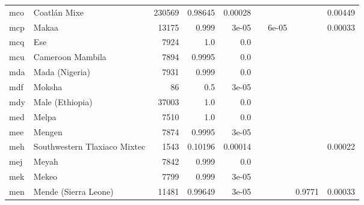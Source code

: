 \documentclass[11pt]{article}
\begin{document}
\begin{table*}[h]
{\begin{tabular}{llrrrrrrr}
mco         & Coatlán Mixe         & 230569         & 0.98645         & 0.00028         &          &          &          & 0.00449         \\

mcp         & Makaa         & 13175         & 0.999         & 3e-05         &          & 6e-05         &          & 0.00033         \\

mcq         & Ese         & 7924         & 1.0         & 0.0         &          &          &          &          \\

mcu         & Cameroon Mambila         & 7894         & 0.9995         & 0.0         &          &          &          &          \\

mda         & Mada (Nigeria)         & 7931         & 0.999         & 0.0         &          &          &          &          \\

mdf         & Moksha         & 86         & 0.5         & 3e-05         &          &          &          &          \\

mdy         & Male (Ethiopia)         & 37003         & 1.0         & 0.0         &          &          &          &          \\

med         & Melpa         & 7510         & 1.0         & 0.0         &          &          &          &          \\

mee         & Mengen         & 7874         & 0.9995         & 3e-05         &          &          &          &          \\

meh         & Southwestern Tlaxiaco Mixtec         & 1543         & 0.10196         & 0.00014         &          &          &          & 0.00022         \\

mej         & Meyah         & 7842         & 0.999         & 0.0         &          &          &          &          \\

mek         & Mekeo         & 7799         & 0.999         & 3e-05         &          &          &          &          \\

men         & Mende (Sierra Leone)         & 11481         & 0.99649         & 3e-05         &          &          & 0.9771         & 0.00033         \\


\end{tabular}}
\end{table*}
\end{document}

